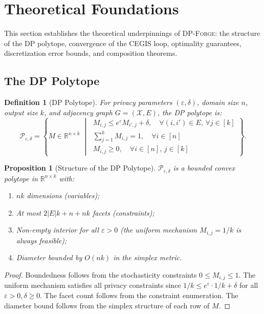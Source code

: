 \documentclass[11pt,a4paper]{article}
\newcommand{\dpforge}{\textsc{DP-Forge}}
\newcommand{\eps}{\varepsilon}
\newcommand{\R}{\mathbb{R}}
\newcommand{\cX}{\mathcal{X}}
\newcommand{\cP}{\mathcal{P}}
\newtheorem{proposition}[theorem]{Proposition}
\newtheorem{definition}{Definition}[section]
\begin{document}
\section{Theoretical Foundations}
\label{sec:theory}

This section establishes the theoretical underpinnings of \dpforge{}: the
structure of the DP polytope, convergence of the CEGIS loop, optimality
guarantees, discretization error bounds, and composition theorems.

\subsection{The DP Polytope}
\label{subsec:polytope}

\begin{definition}[DP Polytope]
\label{def:polytope}
For privacy parameters $(\eps, \delta)$, domain size $n$, output size $k$, and
adjacency graph $G = (\cX, E)$, the \emph{DP polytope} is:
\[
  \cP_{\eps,\delta} = \left\{ M \in \R^{n \times k} \;\middle|\;
  \begin{array}{l}
    M_{i,j} \le e^{\eps} M_{i',j} + \delta, \quad \forall (i,i') \in E, \, \forall j \in [k] \\
    \sum_{j=1}^{k} M_{i,j} = 1, \quad \forall i \in [n] \\
    M_{i,j} \ge 0, \quad \forall i \in [n], \, j \in [k]
  \end{array}
  \right\}.
\]
\end{definition}

\begin{proposition}[Structure of the DP Polytope]
\label{prop:polytope_structure}
$\cP_{\eps,\delta}$ is a bounded convex polytope in $\R^{n \times k}$ with:
\begin{enumerate}[nosep]
  \item $nk$ dimensions (variables);
  \item At most $2|E|k + n + nk$ facets (constraints);
  \item Non-empty interior for all $\eps > 0$ (the uniform mechanism
        $M_{i,j} = 1/k$ is always feasible);
  \item Diameter bounded by $O(nk)$ in the simplex metric.
\end{enumerate}
\end{proposition}

\begin{proof}
Boundedness follows from the stochasticity constraints $0 \le M_{i,j} \le 1$.
The uniform mechanism satisfies all privacy constraints since
$1/k \le e^{\eps} \cdot 1/k + \delta$ for all $\eps > 0, \delta \ge 0$.
The facet count follows from the constraint enumeration.
The diameter bound follows from the simplex structure of each row of $M$.
\end{proof}
\end{document}
